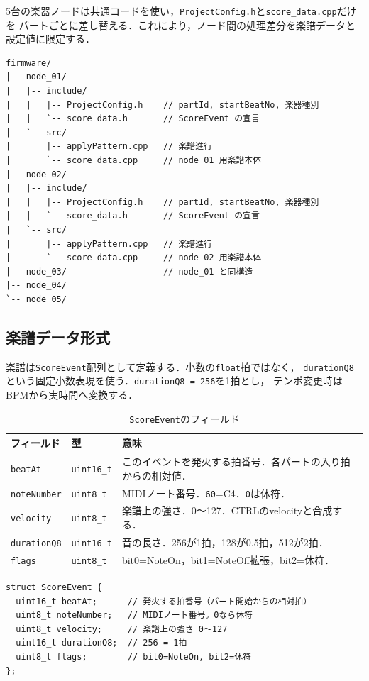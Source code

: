 \documentclass[uplatex,dvipdfmx]{jlreq}
\newcommand{\code}[1]{\texttt{#1}}
\begin{document}
5台の楽器ノードは共通コードを使い，\code{ProjectConfig.h}と\code{score\_data.cpp}だけを
パートごとに差し替える．これにより，ノード間の処理差分を楽譜データと設定値に限定する．

\begin{verbatim}
firmware/
|-- node_01/
|   |-- include/
|   |   |-- ProjectConfig.h    // partId, startBeatNo, 楽器種別
|   |   `-- score_data.h       // ScoreEvent の宣言
|   `-- src/
|       |-- applyPattern.cpp   // 楽譜進行
|       `-- score_data.cpp     // node_01 用楽譜本体
|-- node_02/
|   |-- include/
|   |   |-- ProjectConfig.h    // partId, startBeatNo, 楽器種別
|   |   `-- score_data.h       // ScoreEvent の宣言
|   `-- src/
|       |-- applyPattern.cpp   // 楽譜進行
|       `-- score_data.cpp     // node_02 用楽譜本体
|-- node_03/                   // node_01 と同構造
|-- node_04/
`-- node_05/
\end{verbatim}

\subsection{楽譜データ形式}

楽譜は\code{ScoreEvent}配列として定義する．小数の\code{float}拍ではなく，
\code{durationQ8}という固定小数表現を使う．\code{durationQ8 = 256}を1拍とし，
テンポ変更時はBPMから実時間へ変換する．

\begin{table}[H]
\centering
\caption{\code{ScoreEvent}のフィールド}
\label{tab:scoreevent}
\begin{tabular}{p{}p{}p{}}
\toprule
\textbf{フィールド} & \textbf{型} & \textbf{意味} \\
\midrule
\code{beatAt} & \code{uint16\_t} & このイベントを発火する拍番号．各パートの入り拍からの相対値．\\
\code{noteNumber} & \code{uint8\_t} & MIDIノート番号．\code{60}=C4．\code{0}は休符．\\
\code{velocity} & \code{uint8\_t} & 楽譜上の強さ．0〜127．CTRLのvelocityと合成する．\\
\code{durationQ8} & \code{uint16\_t} & 音の長さ．256が1拍，128が0.5拍，512が2拍．\\
\code{flags} & \code{uint8\_t} & bit0=NoteOn，bit1=NoteOff拡張，bit2=休符．\\
\bottomrule
\end{tabular}
\end{table}

\begin{verbatim}
struct ScoreEvent {
  uint16_t beatAt;      // 発火する拍番号（パート開始からの相対拍）
  uint8_t noteNumber;   // MIDIノート番号。0なら休符
  uint8_t velocity;     // 楽譜上の強さ 0〜127
  uint16_t durationQ8;  // 256 = 1拍
  uint8_t flags;        // bit0=NoteOn, bit2=休符
};
\end{verbatim}
\end{document}
